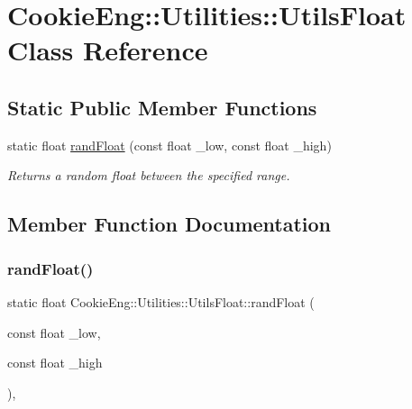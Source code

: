 \hypertarget{class_cookie_eng_1_1_utilities_1_1_utils_float}{}\section{Cookie\+Eng\+:\+:Utilities\+:\+:Utils\+Float Class Reference}
\label{class_cookie_eng_1_1_utilities_1_1_utils_float}
\subsection*{Static Public Member Functions}
\begin{DoxyCompactItemize}
\item 
static float \hyperlink{class_cookie_eng_1_1_utilities_1_1_utils_float_a33f2113c8793098aa33ddef2313a6bb0}{rand\+Float} (const float \+\_\+low, const float \+\_\+high)
\begin{DoxyCompactList}\small\item\em Returns a random float between the specified range. \end{DoxyCompactList}\end{DoxyCompactItemize}


\subsection{Member Function Documentation}
\mbox{\label{class_cookie_eng_1_1_utilities_1_1_utils_float_a33f2113c8793098aa33ddef2313a6bb0}} 
\subsubsection{\texorpdfstring{rand\+Float()}{randFloat()}}
{\footnotesize\ttfamily static float Cookie\+Eng\+::\+Utilities\+::\+Utils\+Float\+::rand\+Float (\begin{DoxyParamCaption}\item[{const float}]{\+\_\+low,  }\item[{const float}]{\+\_\+high }\end{DoxyParamCaption})\hspace{0.3cm}{\ttfamily [inline]}, {\ttfamily [static]}}



